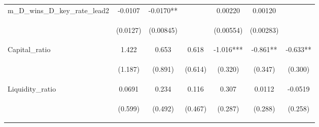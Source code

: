 \documentclass[]{article}
\begin{document}
\begin{center}
\begin{tabular}{lcccccc}
m\_D\_wins\_D\_key\_rate\_lead2 & -0.0107 & -0.0170** &  & 0.00220 & 0.00120 &  \\
\vspace{4pt} & \begin{footnotesize}(0.0127)\end{footnotesize} & \begin{footnotesize}(0.00845)\end{footnotesize} & \begin{footnotesize}\end{footnotesize} & \begin{footnotesize}(0.00554)\end{footnotesize} & \begin{footnotesize}(0.00283)\end{footnotesize} & \begin{footnotesize}\end{footnotesize} \\
Capital\_ratio & 1.422 & 0.653 & 0.618 & -1.016*** & -0.861** & -0.633** \\
\vspace{4pt} & \begin{footnotesize}(1.187)\end{footnotesize} & \begin{footnotesize}(0.891)\end{footnotesize} & \begin{footnotesize}(0.614)\end{footnotesize} & \begin{footnotesize}(0.320)\end{footnotesize} & \begin{footnotesize}(0.347)\end{footnotesize} & \begin{footnotesize}(0.300)\end{footnotesize} \\
Liquidity\_ratio & 0.0691 & 0.234 & 0.116 & 0.307 & 0.0112 & -0.0519 \\
\vspace{4pt} & \begin{footnotesize}(0.599)\end{footnotesize} & \begin{footnotesize}(0.492)\end{footnotesize} & \begin{footnotesize}(0.467)\end{footnotesize} & \begin{footnotesize}(0.287)\end{footnotesize} & \begin{footnotesize}(0.288)\end{footnotesize} & \begin{footnotesize}(0.258)\end{footnotesize} \\

\end{tabular}
\end{center}
\end{document}
